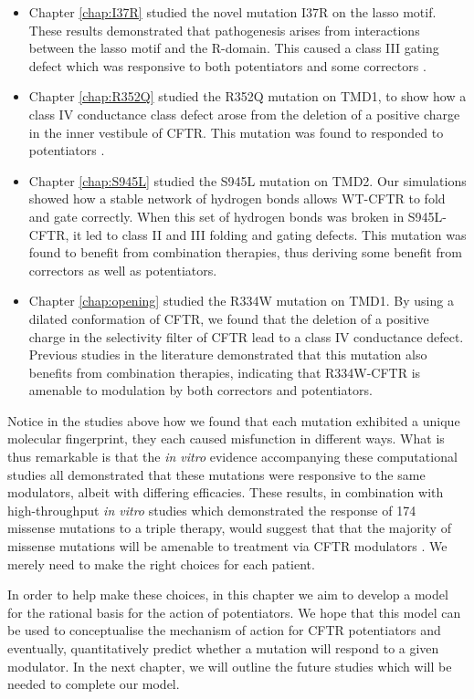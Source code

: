 \bigskip
\begin{itemize}
	\item Chapter \ref{chap:I37R} studied the novel mutation I37R on the lasso motif. These results demonstrated that pathogenesis arises from interactions between the lasso motif and the R-domain. This caused a class III gating defect which was responsive to both potentiators and some correctors \cite{wong2022}. 
	\item Chapter \ref{chap:R352Q} studied the R352Q mutation on TMD1, to show how a class IV conductance class defect arose from the deletion of a positive charge in the inner vestibule of CFTR. This mutation was found to responded to potentiators \cite{wong2022a}.
\item Chapter \ref{chap:S945L} studied the S945L mutation on TMD2. Our simulations showed how a stable network of hydrogen bonds allows WT-CFTR to fold and gate correctly. When this set of hydrogen bonds was broken in S945L-CFTR, it led to class II and III folding and gating defects. This mutation was found to benefit from combination therapies, thus deriving some benefit from correctors as well as potentiators.  
\item Chapter \ref{chap:opening} studied the R334W mutation on TMD1. By using a dilated conformation of CFTR, we found that the deletion of a positive charge in the selectivity filter of CFTR lead to a class IV conductance defect. Previous studies in the literature demonstrated that this mutation also benefits from combination therapies, indicating that R334W-CFTR is amenable to modulation by both correctors and potentiators. 
\end{itemize}

Notice in the studies above how we found that each mutation exhibited a unique molecular fingerprint, they each caused misfunction in different ways. What is thus remarkable is that the \textit{in vitro} evidence accompanying these computational studies all demonstrated that these mutations were responsive to the same modulators, albeit with differing efficacies. These results, in combination with high-throughput \textit{in vitro} studies which demonstrated the response of 174 missense mutations to a triple therapy, would suggest that that the majority of missense mutations will be amenable to treatment via CFTR modulators \cite{trikafta_FDA_info}. We merely need to make the right choices for each patient.

In order to help make these choices, in this chapter we aim to develop a model for the rational basis for the action of potentiators. We hope that this model can be used to conceptualise the mechanism of action for CFTR potentiators and eventually, quantitatively predict whether a mutation will respond to a given modulator. In the next chapter, we will outline the future studies which will be needed to complete our model.

